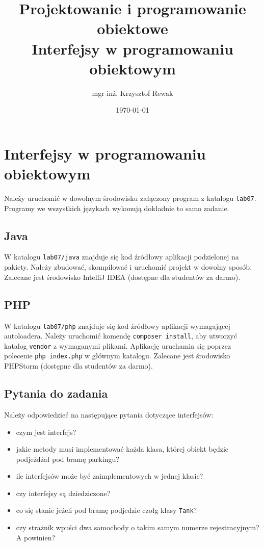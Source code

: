 \documentclass{article}
\title{
	Projektowanie i programowanie obiektowe \\
	\Huge{Interfejsy w programowaniu obiektowym}
}
\author{mgr inż. Krzysztof Rewak}
\date{\today}
\begin{document}
	\maketitle

	\section{Interfejsy w programowaniu obiektowym}
	Należy uruchomić w dowolnym środowisku załączony program z katalogu \texttt{lab07}. Programy we wszystkich językach wykonują dokładnie to samo zadanie.
	
	\subsection{Java}
	W katalogu \texttt{lab07/java} znajduje się kod źródłowy aplikacji podzielonej na pakiety. Należy zbudować, skompilować i uruchomić projekt w dowolny sposób. Zalecane jest środowisko IntelliJ IDEA (dostępne dla studentów za darmo).
	
	\subsection{PHP}
	W katalogu \texttt{lab07/php} znajduje się kod źródłowy aplikacji wymagającej autoloadera. Należy uruchomić komendę \texttt{composer install}, aby utworzyć katalog \texttt{vendor} z wymaganymi plikami. Aplikację uruchamia się poprzez polecenie \texttt{php index.php} w głównym katalogu. Zalecane jest środowisko PHPStorm (dostępne dla studentów za darmo).
	
	\subsection{Pytania do zadania}
	Należy odpowiedzieć na następujące pytania dotyczące interfejsów:
	\begin{itemize}
		\item czym jest interfejs?
		\item jakie metody musi implementować każda klasa, której obiekt będzie podjeżdżał pod bramę parkingu?
		\item ile interfejsów może być zaimplementowych w jednej klasie?
		\item czy interfejsy są dziedziczone?
		\item co się stanie jeżeli pod bramę podjedzie czołg klasy \texttt{Tank}?
		\item czy strażnik wpuści dwa samochody o takim samym numerze rejestracyjnym? A powinien?
	\end{itemize}
	
\end{document}
